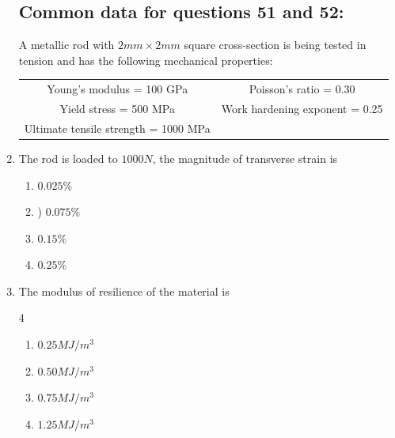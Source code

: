 \documentclass[journal]{IEEEtran}
\theoremstyle{remark}
\begin{document}
\begin{enumerate}
\subsection*{Common data for questions 51 and 52:}
A metallic rod with $2 mm \times 2 mm$ square cross-section is being tested in tension and has the following mechanical properties: \\
\begin{center}
    \begin{tabular}{c c}
      Young's modulus = 100 GPa   & Poisson's ratio = 0.30 \\
     Yield stress = 500 MPa   & Work hardening exponent = 0.25\\
     Ultimate tensile strength = 1000 MPa&  
    \end{tabular}
\end{center}
\item   The rod is loaded to $1000 N$, the magnitude of transverse strain is
\hfill{}
\begin{multicols}{4}
\begin{enumerate}
\item   $0.025\%$
\item) $0.075\%$
\item  $0.15\%$
\item $0.25\%$
\end{enumerate}
\end{multicols}

\item   The modulus of resilience of the material is
\hfill{}

\begin {multicols}{4}
\begin{enumerate}
\item  $0.25 MJ/m^3$
\item  $0.50 MJ/m^3$
\item  $0.75 MJ/m^3$
\item  $1.25 MJ/m^3$
\end{enumerate}
\end{multicols}

\end{enumerate}
\end{document}
